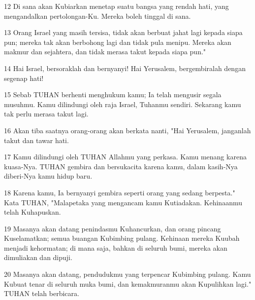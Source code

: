 \par 12 Di sana akan Kubiarkan menetap suatu bangsa yang rendah hati, yang mengandalkan pertolongan-Ku. Mereka boleh tinggal di sana.
\par 13 Orang Israel yang masih tersisa, tidak akan berbuat jahat lagi kepada siapa pun; mereka tak akan berbohong lagi dan tidak pula menipu. Mereka akan makmur dan sejahtera, dan tidak merasa takut kepada siapa pun."
\par 14 Hai Israel, bersoraklah dan bernyanyi! Hai Yerusalem, bergembiralah dengan segenap hati!
\par 15 Sebab TUHAN berhenti menghukum kamu; Ia telah mengusir segala musuhmu. Kamu dilindungi oleh raja Israel, Tuhanmu sendiri. Sekarang kamu tak perlu merasa takut lagi.
\par 16 Akan tiba saatnya orang-orang akan berkata nanti, "Hai Yerusalem, janganlah takut dan tawar hati.
\par 17 Kamu dilindungi oleh TUHAN Allahmu yang perkasa. Kamu menang karena kuasa-Nya. TUHAN gembira dan bersukacita karena kamu, dalam kasih-Nya diberi-Nya kamu hidup baru.
\par 18 Karena kamu, Ia bernyanyi gembira seperti orang yang sedang berpesta." Kata TUHAN, "Malapetaka yang mengancam kamu Kutiadakan. Kehinaanmu telah Kuhapuskan.
\par 19 Masanya akan datang penindasmu Kuhancurkan, dan orang pincang Kuselamatkan; semua buangan Kubimbing pulang. Kehinaan mereka Kuubah menjadi kehormatan; di mana saja, bahkan di seluruh bumi, mereka akan dimuliakan dan dipuji.
\par 20 Masanya akan datang, pendudukmu yang terpencar Kubimbing pulang. Kamu Kubuat tenar di seluruh muka bumi, dan kemakmuranmu akan Kupulihkan lagi." TUHAN telah berbicara.


